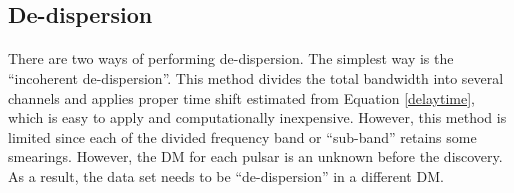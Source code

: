 \documentclass[thesis_msc.tex]{subfiles}
\begin{document}


        
        \subsection{De-dispersion} \label{DDM}
       \paragraph{} There are two ways of performing de-dispersion. The simplest way is the ``incoherent de-dispersion''. This method divides the total bandwidth into several channels and applies proper time shift estimated from Equation \ref{delaytime}, which is easy to apply and computationally inexpensive. However, this method is limited since each of the divided frequency band or ``sub-band'' retains some smearings. %
       However, the DM for each pulsar is an unknown before the discovery. As a result, the data set needs to be ``de-dispersion'' in a different DM. 
\end{document}
